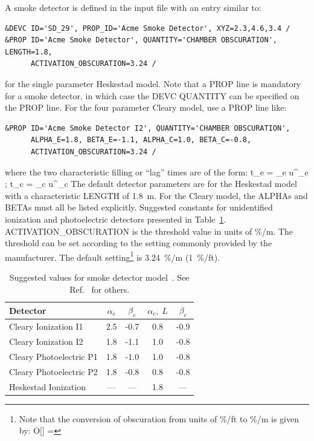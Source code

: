 \documentclass[11pt]{book}
\begin{document}
A smoke detector is defined in the input file with an entry similar to:
\begin{lstlisting}
&DEVC ID='SD_29', PROP_ID='Acme Smoke Detector', XYZ=2.3,4.6,3.4 /
&PROP ID='Acme Smoke Detector', QUANTITY='CHAMBER OBSCURATION', LENGTH=1.8,
      ACTIVATION_OBSCURATION=3.24 /
\end{lstlisting}
for the single parameter Heskestad model. Note that a {\ct PROP} line is mandatory for a smoke detector, in which case the {\ct DEVC QUANTITY} can be specified on the {\ct PROP} line. For the four parameter Cleary model, use a {\ct PROP} line like:
\begin{lstlisting}
&PROP ID='Acme Smoke Detector I2', QUANTITY='CHAMBER OBSCURATION',
      ALPHA_E=1.8, BETA_E=-1.1, ALPHA_C=1.0, BETA_C=-0.8,
      ACTIVATION_OBSCURATION=3.24 /
\end{lstlisting}
where the two characteristic filling or ``lag'' times are of the form:
\be
   \delta t_e = \alpha_e u^{\beta_e} \quad ; \quad \delta t_c = \alpha_c u^{\beta_c}
\ee
The default detector parameters are for the Heskestad model with a characteristic {\ct LENGTH} of
1.8~m. For the Cleary model, the {\ct ALPHA}s and {\ct BETA}s must all be listed explicitly.
Suggested constants for unidentified ionization and photoelectric detectors
presented in Table~\ref{tab:sdvalues}.
{\ct ACTIVATION\_OBSCURATION} is the threshold value in units of \%/m.
The threshold can be set according to the setting commonly provided by the manufacturer.
The default setting\footnote{Note that the conversion of obscuration from units of \%/ft to \%/m is given by:
\be
   O[] =  
\ee
} is 3.24~\%/m (1~\%/ft).

\begin{table}[ht]
\caption[Suggested values for smoke detector model]{Suggested values for smoke detector model~\cite{Cleary:IAFSS6}. See Ref.~\cite{SFPE} for others.}
\vspace{0.1in}
\label{tab:sdvalues}
\begin{center}
\begin{tabular}{|l||c|c|c|c|}
\hline
Detector                      & $\alpha_e$  &  $\beta_e$   &  $\alpha_c, \; L$   &  $\beta_c$  \\ \hline \hline
Cleary Ionization    I1       & 2.5         & -0.7         &  0.8                &  -0.9      \\ \hline
Cleary Ionization    I2       & 1.8         & -1.1         &  1.0                &  -0.8      \\ \hline
Cleary Photoelectric P1       & 1.8         & -1.0         &  1.0                &  -0.8      \\ \hline
Cleary Photoelectric P2       & 1.8         & -0.8         &  0.8                &  -0.8      \\ \hline
Heskestad Ionization          & ---         & ---          &  1.8                &  ---       \\ \hline\end{tabular}
\end{center}
\end{table}
\end{document}
